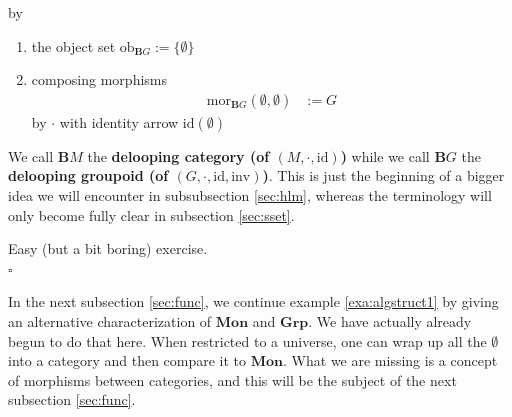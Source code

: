\begin{exa}
by
\begin{enumerate}
\item[$\bullet$]
the object set $\mathrm{ob}_{\mathbf{B}G} := \lbrace \emptyset \rbrace$
\item[$\bullet$]
composing morphisms
\begin{align*}
  \mathrm{mor}_{\mathbf{B}G}(\emptyset,\emptyset)
  &:=
  G
\end{align*}
by $\cdot$ with identity arrow $\mathrm{id}(\emptyset)$
\end{enumerate}
We call $\mathbf{B}M$ the \textbf{delooping category (of $(M,\cdot,\mathrm{id})$)} while we call $\mathbf{B}G$ the \textbf{delooping groupoid (of $(G,\cdot,\mathrm{id},\mathrm{inv})$)}.
This is just the beginning of a bigger idea we will encounter in subsubsection \ref{sec:hlm}, whereas the terminology will only become fully clear in subsection \ref{sec:sset}.
\end{exa}
\begin{prf}
Easy (but a bit boring) exercise.
\\
\phantom{proven}
\hfill
$\square$
\end{prf}
In the next subsection \ref{sec:func}, we continue example \ref{exa:algstruct1} by giving an alternative characterization of $\mathbf{Mon}$ and $\mathbf{Grp}$.
We have actually already begun to do that here.
When restricted to a universe, one can wrap up all the $\pmb{\emptyset}$ into a category and then compare it to $\mathbf{Mon}$.
What we are missing is a concept of morphisms between categories, and this will be the subject of the next subsection \ref{sec:func}.
